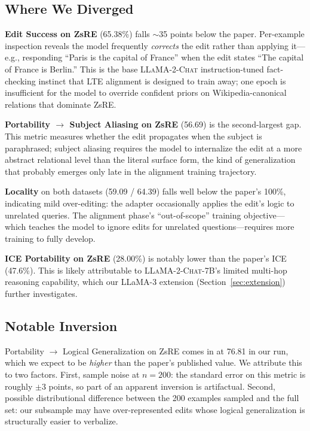 \documentclass[11pt,a4paper,twocolumn]{article}
\begin{document}
\subsection{Where We Diverged}

\textbf{Edit Success on ZsRE} (65.38\%) falls ${\sim}$35 points below the paper. Per-example inspection reveals the model frequently \emph{corrects} the edit rather than applying it---e.g., responding ``Paris is the capital of France'' when the edit states ``The capital of France is Berlin.'' This is the base \textsc{LLaMA-2-Chat} instruction-tuned fact-checking instinct that LTE alignment is designed to train away; one epoch is insufficient for the model to override confident priors on Wikipedia-canonical relations that dominate ZsRE.

\textbf{Portability $\rightarrow$ Subject Aliasing on ZsRE} (56.69) is the second-largest gap. This metric measures whether the edit propagates when the subject is paraphrased; subject aliasing requires the model to internalize the edit at a more abstract relational level than the literal surface form, the kind of generalization that probably emerges only late in the alignment training trajectory.

\textbf{Locality} on both datasets (59.09 / 64.39) falls well below the paper's 100\%, indicating mild over-editing: the adapter occasionally applies the edit's logic to unrelated queries. The alignment phase's ``out-of-scope'' training objective---which teaches the model to ignore edits for unrelated questions---requires more training to fully develop.

\textbf{ICE Portability on ZsRE} (28.00\%) is notably lower than the paper's ICE (47.6\%). This is likely attributable to \textsc{LLaMA-2-Chat-7B}'s limited multi-hop reasoning capability, which our LLaMA-3 extension (Section~\ref{sec:extension}) further investigates.

\subsection{Notable Inversion}

Portability $\rightarrow$ Logical Generalization on ZsRE comes in at 76.81 in our run, which we expect to be \emph{higher} than the paper's published value. We attribute this to two factors. First, sample noise at $n=200$: the standard error on this metric is roughly $\pm 3$ points, so part of an apparent inversion is artifactual. Second, possible distributional difference between the 200 examples sampled and the full set: our subsample may have over-represented edits whose logical generalization is structurally easier to verbalize.
\end{document}
